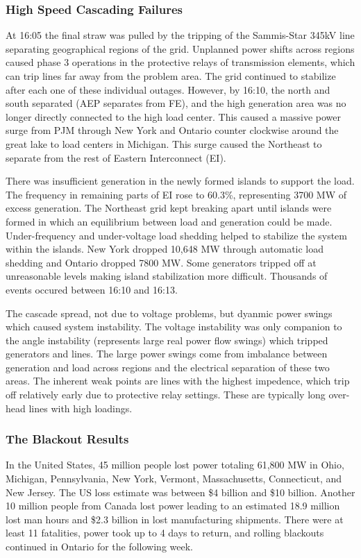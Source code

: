 \subsubsection{High Speed Cascading Failures}
At 16:05 the final straw was pulled by the tripping of the Sammis-Star 345kV line separating geographical regions of the grid.  Unplanned power shifts across regions caused phase 3 operations in the protective relays of transmission elements, which can trip lines far away from the problem area.  The grid continued to stabilize after each one of these individual outages.  However, by 16:10, the north and south separated (AEP separates from FE), and the high generation area was no longer directly connected to the high load center.  This caused a massive power surge from PJM through New York and Ontario counter clockwise around the great lake to load centers in Michigan. This surge caused the Northeast to separate from the rest of Eastern Interconnect (EI).

There was insufficient generation in the newly formed islands to support the load.  The frequency in remaining parts of EI rose to 60.3\%, representing 3700 MW of excess generation.  The Northeast grid kept breaking apart until islands were formed in which an equilibrium between load and generation could be made.  Under-frequency and under-voltage load shedding helped to stabilize the system within the islands.  New York dropped 10,648 MW through automatic load shedding and Ontario dropped 7800 MW.  Some generators tripped off at unreasonable levels making island stabilization more difficult.  Thousands of events occured between 16:10 and 16:13.  

The cascade spread, not due to voltage problems, but dyanmic power swings which caused system instability.  The voltage instability was only companion to the angle instability (represents large real power flow swings) which tripped generators and lines.  The large power swings come from imbalance between generation and load across regions and the electrical separation of these two areas.  The inherent weak points are lines with the highest impedence, which trip off relatively early due to protective relay settings.  These are typically long over-head lines with high loadings.


\subsubsection{The Blackout Results}
In the United States, 45 million people lost power totaling 61,800 MW in Ohio, Michigan, Pennsylvania, New York, Vermont, Massachusetts, Connecticut, and New Jersey.  The US loss estimate was between \$4 billion and \$10 billion.  Another 10 million people from Canada lost power leading to an estimated 18.9 million lost man hours and \$2.3 billion in lost manufacturing shipments.   There were at least 11 fatalities, power took up to 4 days to return, and rolling blackouts continued in Ontario for the following week.\cite{northeast_2003}


